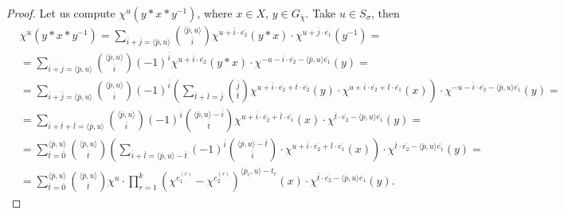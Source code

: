 \documentclass[a4paper, 11pt]{amsart}
\theoremstyle{plain}
\theoremstyle{remark}
\theoremstyle{definition}
\newcommand{\GG}{G_{\overline{\chi}}}
\newcommand{\ol}[1]{\overline{#1}}
\begin{document}
\begin{proof}
Let us compute $\chi^u(y*x*y^{-1})$, where $x\in X$, $y \in \GG$. Take $u \in S_\sigma$, then
\begin{align*}
	&\chi^u(y*x*y^{-1}) = \sum \limits_{\ol{i} + \ol{j} = \langle \ol{p}, u \rangle } { \langle \ol{p}, u \rangle \choose \ol{i} } \chi^{u + \ol{i}\cdot \ol{e_2}}(y*x) \cdot  \chi^{u + \ol{j}\cdot \ol{e_1}} (y^{-1}) = \\
	&=\sum \limits_{\ol{i} + \ol{j} = \langle \ol{p}, u \rangle } { \langle \ol{p}, u \rangle \choose \ol{i} } (-1)^{\ol{i}} \chi^{u + \ol{i}\cdot \ol{e_2}}(y*x) \cdot  \chi^{-u - \ol{i}\cdot \ol{e_2} - \langle \ol{p}, u \rangle \ol{e_1}} (y) =\\
	&= \sum \limits_{\ol{i} + \ol{j} = \langle \ol{p}, u \rangle } { \langle \ol{p}, u \rangle \choose \ol{i} } (-1)^{\ol{i}} \left(
	\sum \limits_{\ol{t} + \ol{l} = \ol{j}} { \ol{j} \choose \ol{t} } \chi^{u + \ol{i}\cdot \ol{e_2} +  \ol{t}\cdot \ol{e_2}}(y) \cdot  \chi^{u + \ol{i}\cdot \ol{e_2} + \ol{l}\cdot \ol{e_1}} (x)
	 \right)  
	\cdot \chi^{-u - \ol{i}\cdot \ol{e_2} - \langle \ol{p}, u \rangle \ol{e_1}} (y)=\\
	&= \sum \limits_{\ol{i} + \ol{t} + \ol{l} = \langle \ol{p}, u \rangle } { \langle \ol{p}, u \rangle \choose \ol{i} } (-1)^{\ol{i}}  {\langle \ol{p}, u \rangle - \ol{i}  \choose \ol{t} } \chi^{u + \ol{i}\cdot \ol{e_2} +  \ol{l}\cdot \ol{e_1}}(x) \cdot  \chi^{\ol{t}\cdot \ol{e_2} - \langle \ol{p}, u \rangle \ol{e_1} } (y)=\\
	&= \sum \limits_{\ol{t} = \ol{0}}^{\langle \ol{p}, u \rangle}  { \langle \ol{p}, u \rangle \choose \ol{t} }  \left( \sum \limits_{\ol{i} + \ol{l} = \langle \ol{p}, u \rangle - \ol{t}} (-1)^{\ol{i}} { \langle \ol{p}, u \rangle - \ol{t} \choose \ol{i} }  \cdot  \chi^{u + \ol{i}\cdot \ol{e_2} + \ol{l}\cdot \ol{e_1}} (x) \right) 
	\cdot \chi^{\ol{t}\cdot \ol{e_2} - \langle \ol{p}, u \rangle \ol{e_1}} (y)=\\
	&= \sum \limits_{\ol{t} = \ol{0}}^{\langle \ol{p}, u \rangle}  { \langle \ol{p}, u \rangle \choose \ol{t} }  
	\chi^u \cdot \prod\limits_{r = 1}^{k}\left( \chi^{e_1^{(r)}} - \chi^{e_2^{(r)}}\right)^{\langle p_r , u\rangle - t_r} (x)
	\cdot  \chi^{\ol{t}\cdot \ol{e_2} - \langle \ol{p}, u \rangle \ol{e_1}} (y).
\end{align*}


\end{proof}
\end{document}
